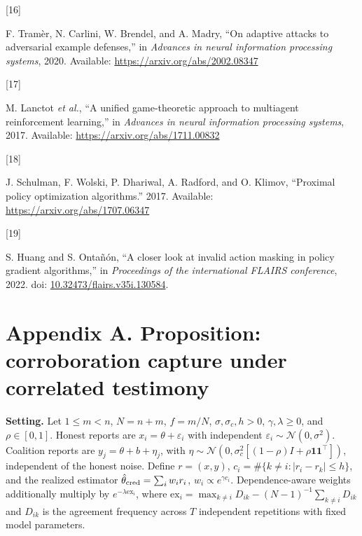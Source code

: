\documentclass[
  12pt,
]{article}
\newlength{\cslhangindent}
\newlength{\csllabelwidth}
\newenvironment{CSLReferences}[2] %
 {\begin{list}{}{%
  \setlength{\itemindent}{0pt}
  \setlength{\leftmargin}{0pt}
  \setlength{\parsep}{0pt}
  \ifodd #1
   \setlength{\leftmargin}{\cslhangindent}
   \setlength{\itemindent}{-1\cslhangindent}
  \fi
  \setlength{\itemsep}{#2\baselineskip}}}
 {\end{list}}
\newcommand{\CSLLeftMargin}[1]{\parbox[t]{\csllabelwidth}{\strut#1\strut}}
\newcommand{\CSLRightInline}[1]{\parbox[t]{\linewidth - \csllabelwidth}{\strut#1\strut}}
\begin{document}
\begin{CSLReferences}{0}{0}
\CSLLeftMargin{{[}16{]} }%
\CSLRightInline{F. Tramèr, N. Carlini, W. Brendel, and A. Madry, {``On
adaptive attacks to adversarial example defenses,''} in \emph{Advances
in neural information processing systems}, 2020. Available:
\url{https://arxiv.org/abs/2002.08347}}

\CSLLeftMargin{{[}17{]} }%
\CSLRightInline{M. Lanctot \emph{et al.}, {``A unified game-theoretic
approach to multiagent reinforcement learning,''} in \emph{Advances in
neural information processing systems}, 2017. Available:
\url{https://arxiv.org/abs/1711.00832}}

\CSLLeftMargin{{[}18{]} }%
\CSLRightInline{J. Schulman, F. Wolski, P. Dhariwal, A. Radford, and O.
Klimov, {``Proximal policy optimization algorithms.''} 2017. Available:
\url{https://arxiv.org/abs/1707.06347}}

\CSLLeftMargin{{[}19{]} }%
\CSLRightInline{S. Huang and S. Ontañón, {``A closer look at invalid
action masking in policy gradient algorithms,''} in \emph{Proceedings of
the international FLAIRS conference}, 2022. doi:
\href{https://doi.org/10.32473/flairs.v35i.130584}{10.32473/flairs.v35i.130584}.}

\end{CSLReferences}

\FloatBarrier

\section*{Appendix A. Proposition: corroboration capture under
correlated
testimony}\label{appendix-a.-proposition-corroboration-capture-under-correlated-testimony}

\textbf{Setting.} Let \(1\le m<n\), \(N=n+m\), \(f=m/N\),
\(\sigma,\sigma_c,h>0\), \(\gamma,\lambda\ge0\), and \(\rho\in[0,1]\).
Honest reports are \(x_i=\theta+\varepsilon_i\) with independent
\(\varepsilon_i\sim\mathcal N(0,\sigma^2)\). Coalition reports are
\(y_j=\theta+b+\eta_j\), with
\(\eta\sim\mathcal N(0,\sigma_c^2[(1-\rho)I+\rho\mathbf1\mathbf1^\top])\),
independent of the honest noise. Define \(r=(x,y)\),
\(c_i=\#\{k\ne i:|r_i-r_k|\le h\}\), and the realized estimator
\(\hat\theta_{\rm cred}=\sum_i w_i r_i\), \(w_i\propto e^{\gamma c_i}\).
Dependence-aware weights additionally multiply by
\(e^{-\lambda\mathrm{ex}_i}\), where
\(\mathrm{ex}_i=\max_{k\ne i}D_{ik}-(N-1)^{-1}\sum_{k\ne i}D_{ik}\) and
\(D_{ik}\) is the agreement frequency across \(T\) independent
repetitions with fixed model parameters.
\end{document}
